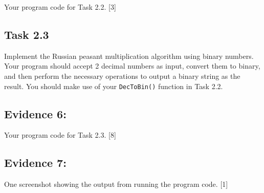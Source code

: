 Your program code for Task 2.2. \hfill{}{[}3{]}

\subsection*{Task 2.3}

Implement the Russian peasant multiplication algorithm using binary
numbers. Your program should accept 2 decimal numbers as input, convert
them to binary, and then perform the necessary operations to output
a binary string as the result. You should make use of your \texttt{DecToBin()}
function in Task 2.2. 

\subsection*{Evidence 6: }

Your program code for Task 2.3. \hfill{} {[}8{]}

\subsection*{Evidence 7: }

One screenshot showing the output from running the program code. \hfill{}
{[}1{]}